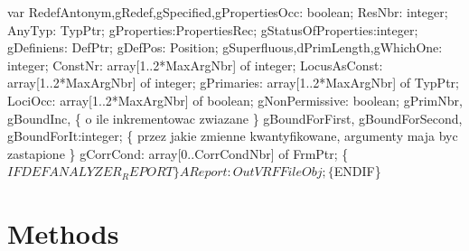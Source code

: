 \nwenddocs{}\endmoddef\nwstartdeflinemarkup{}\nwenddeflinemarkup
var
   RedefAntonym,gRedef,gSpecified,gPropertiesOcc: boolean;
   ResNbr: integer;
   AnyTyp: TypPtr;
   gProperties:PropertiesRec;
   gStatusOfProperties:integer;
   gDefiniens: DefPtr;
   gDefPos: Position;
   gSuperfluous,dPrimLength,gWhichOne: integer;
   ConstNr: array[1..2*MaxArgNbr] of integer;
   LocusAsConst: array[1..2*MaxArgNbr] of integer;
   gPrimaries: array[1..2*MaxArgNbr] of TypPtr;
   LociOcc: array[1..2*MaxArgNbr] of boolean;
   gNonPermissive: boolean;
   gPrimNbr,
   gBoundInc, \{ o ile inkrementowac zwiazane \}
   gBoundForFirst, gBoundForSecond, gBoundForIt:integer;
   \{ przez jakie zmienne kwantyfikowane, argumenty maja byc zastapione \}
   gCorrCond: array[0..CorrCondNbr] of FrmPtr;
   \{$IFDEF ANALYZER_REPORT\}
   AReport:OutVRFFileObj;
   \{$ENDIF\}   
\nwendcode{}\nwdocspar

\section{Methods}

